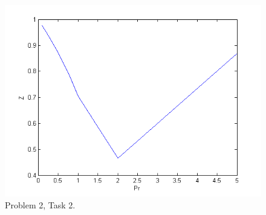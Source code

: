 \documentclass[12pts,a4paper,amsmath,amssymb,floatfix]{article}%
\begin{document}
\begin{enumerate}[label=\bfseries Problem \arabic*:]
\begin{enumerate}[label=\bfseries Task \arabic*:]
\begin{figure}[h]
\begin{center}
                   \includegraphics[width=15.cm,height=10.cm,clip]{./Figs/NH3.png}
               \end{center}
               \caption{Problem 2, Task 2. }
               \label{Prob2_Task2}
            \end{figure}

      \end{enumerate} 


\end{enumerate}
\end{document}
